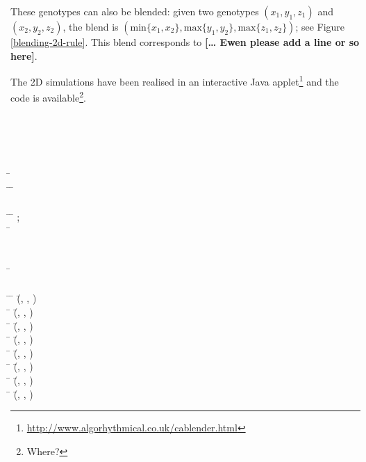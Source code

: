 \documentclass{AISB2008}
\begin{document}
These genotypes can also be blended: given two genotypes $(x_1, y_1,
z_1)$ and $(x_2, y_2, z_2)$, the blend is $(\mathrm{min} \{x_1,x_2\},
\mathrm{max} \{y_1,y_2\}, \mathrm{max} \{z_1,z_2\})$; see Figure
\ref{blending-2d-rule}.  This blend corresponds to \textbf{[\ldots
    Ewen please add a line or so here]}.

The 2D simulations have been realised in an interactive Java
applet\footnote{\url{http://www.algorhythmical.co.uk/cablender.html}}
and the code is available\footnote{Where?}.

\FloatBarrier
\newpage

\begin{listing}
{\scriptsize
\begin{hetcasl}
 \\
\\
 \\
\\
\SPEC \= \Ax{=}\\
\>   \= \Ax{:}\Ax{:}\=\Ax{=}  \AltBar{} \\
\> \SORT {}\\
\> \OPS \= \Ax{:} \= \Ax{\times}  \Ax{\times}  \Ax{\rightarrow} ;\\
\>\> \Ax{\_\_} \Ax{:} \= \Ax{\rightarrow} \\
\\
\\
\SPEC \= \Ax{=}\\
\> \\
\THEN \=\Ax{\bullet} \= (\=, , ) \Ax{=} \\
\> \Ax{\bullet} \= (\=, , ) \Ax{=} \\
\> \Ax{\bullet} \= (\=, , ) \Ax{=} \\
\> \Ax{\bullet} \= (\=, , ) \Ax{=} \\
\> \Ax{\bullet} \= (\=, , ) \Ax{=} \\
\> \Ax{\bullet} \= (\=, , ) \Ax{=} \\
\> \Ax{\bullet} \= (\=, , ) \Ax{=} \\
\> \Ax{\bullet} \= (\=, , ) \Ax{=} \\

\end{hetcasl}}
\end{listing}
\end{document}
